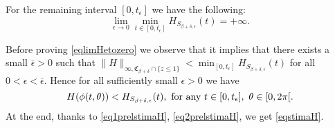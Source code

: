 \documentclass[a4paper,reqno,10pt,oneside]{amsart}
\numberwithin{equation}{section}
\begin{document}
For the remaining interval  $[0,t_{\epsilon}]$ we have the following:
\begin{equation}\label{eqlimHetozero}
\lim_{{\epsilon} \to 0} \min_{t \in [0,t_{\epsilon}]} H_{S_{\beta + \delta,\epsilon}}(t) = + \infty.
\end{equation}

Before proving \eqref{eqlimHetozero} we observe that it implies that there exists a small $\bar{\epsilon}>0$ such that $\|H\|_{\infty, \overline{\mathfrak{C}_{\beta + \delta}}\cap\{z\leq1\}} <  \min_{[0,t_{\epsilon}]} H_{S_{\beta + \delta,\epsilon}}(t)$ for all $0<{\epsilon}<\bar {\epsilon}$. Hence for all sufficiently small ${\epsilon}>0$ we have
\begin{equation}\label{eq2prelstimaH}
 H(\phi(t,\theta)) < H_{S_{\beta + \delta,\epsilon}}(t),\ \hbox{for any}\ t \in [0,t_{\epsilon}],\ \theta \in [0,2\pi[.
\end{equation}
At the end, thanks to \eqref{eq1prelstimaH}, \eqref{eq2prelstimaH}, we get \eqref{eqstimaH}.
\end{document}
